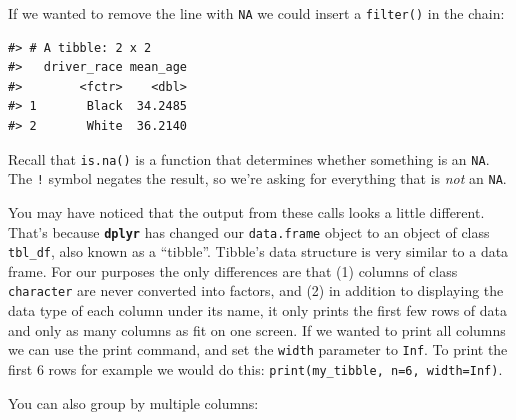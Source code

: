 \documentclass[]{book}
\newenvironment{Shaded}{\begin{snugshade}}{\end{snugshade}}
\newcommand{\KeywordTok}[1]{\textcolor[rgb]{0.13,0.29,0.53}{\textbf{#1}}}
\newcommand{\DataTypeTok}[1]{\textcolor[rgb]{0.13,0.29,0.53}{#1}}
\newcommand{\StringTok}[1]{\textcolor[rgb]{0.31,0.60,0.02}{#1}}
\newcommand{\OtherTok}[1]{\textcolor[rgb]{0.56,0.35,0.01}{#1}}
\newcommand{\OperatorTok}[1]{\textcolor[rgb]{0.81,0.36,0.00}{\textbf{#1}}}
\newcommand{\NormalTok}[1]{#1}
\theoremstyle{definition}
\theoremstyle{definition}
\theoremstyle{definition}
\theoremstyle{remark}
\begin{document}
If we wanted to remove the line with \texttt{NA} we could insert a
\texttt{filter()} in the chain:

\begin{Shaded}
\end{Shaded}

\begin{verbatim}
#> # A tibble: 2 x 2
#>   driver_race mean_age
#>        <fctr>    <dbl>
#> 1       Black  34.2485
#> 2       White  36.2140
\end{verbatim}

Recall that \texttt{is.na()} is a function that determines whether
something is an \texttt{NA}. The \texttt{!} symbol negates the result,
so we're asking for everything that is \emph{not} an \texttt{NA}.

You may have noticed that the output from these calls looks a little
different. That's because \textbf{\texttt{dplyr}} has changed our
\texttt{data.frame} object to an object of class \texttt{tbl\_df}, also
known as a ``tibble''. Tibble's data structure is very similar to a data
frame. For our purposes the only differences are that (1) columns of
class \texttt{character} are never converted into factors, and (2) in
addition to displaying the data type of each column under its name, it
only prints the first few rows of data and only as many columns as fit
on one screen. If we wanted to print all columns we can use the print
command, and set the \texttt{width} parameter to \texttt{Inf}. To print
the first 6 rows for example we would do this:
\texttt{print(my\_tibble,\ n=6,\ width=Inf)}.

You can also group by multiple columns:

\begin{Shaded}
\end{Shaded}
\end{document}
